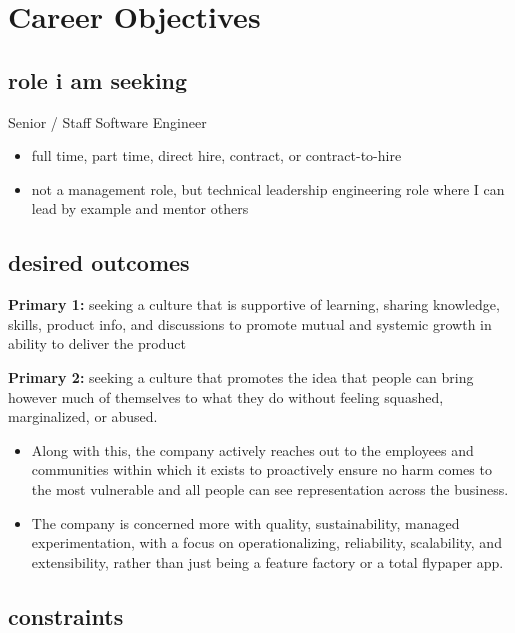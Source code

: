 \documentclass[
]{article}
\author{}
\date{}
\providecommand{\tightlist}{%
  \setlength{\itemsep}{0pt}\setlength{\parskip}{0pt}}
\begin{document}
\section{Career Objectives}\label{career-objectives}

\subsection{role i am seeking}\label{role-i-am-seeking}

Senior / Staff Software Engineer

\begin{itemize}
\tightlist
\item
  full time, part time, direct hire, contract, or contract-to-hire
\item
  not a management role, but technical leadership engineering role where I
  can lead by example and mentor others
\end{itemize}

\subsection{desired outcomes}\label{desired-outcomes}

\textbf{Primary 1:} seeking a culture that is supportive of learning,
sharing knowledge, skills, product info, and discussions to promote
mutual and systemic growth in ability to deliver the product

\textbf{Primary 2:} seeking a culture that promotes the idea that people
can bring however much of themselves to what they do without feeling
squashed, marginalized, or abused.

\begin{itemize}
\item
  Along with this, the company actively reaches out to the employees and
  communities within which it exists to proactively ensure no harm comes
  to the most vulnerable and all people can see representation across
  the business.
\item
  The company is concerned more with quality, sustainability, managed
  experimentation, with a focus on operationalizing, reliability,
  scalability, and extensibility, rather than just being a feature factory or
  a total flypaper app.
\end{itemize}

\subsection{constraints}\label{constraints}
\end{document}
